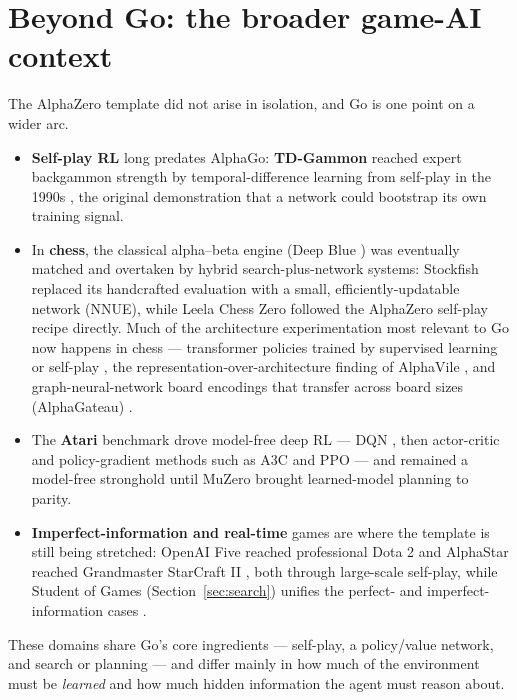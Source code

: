 \documentclass[11pt]{article}
\begin{document}
\section{Beyond Go: the broader game-AI context}
\label{sec:beyond}
The AlphaZero template did not arise in isolation, and Go is one point on a wider arc.
\begin{itemize}[noitemsep]
  \item \textbf{Self-play RL} long predates AlphaGo: \textbf{TD-Gammon} reached expert
        backgammon strength by temporal-difference learning from self-play in the
        1990s \cite{tdgammon1995}, the original demonstration that a network could bootstrap
        its own training signal.
  \item In \textbf{chess}, the classical alpha--beta engine (Deep Blue \cite{deepblue2002})
        was eventually matched and overtaken by hybrid search-plus-network systems: Stockfish
        replaced its handcrafted evaluation with a small, efficiently-updatable network
        (NNUE), while Leela Chess Zero followed the AlphaZero self-play recipe directly. Much
        of the architecture experimentation most relevant to Go now happens in chess ---
        transformer policies trained by supervised learning \cite{chessbench2024} or
        self-play \cite{chessformer2024}, the representation-over-architecture finding of
        AlphaVile \cite{alphavile2024}, and graph-neural-network board encodings that transfer
        across board sizes (AlphaGateau) \cite{alphagateau2024}.
  \item The \textbf{Atari} benchmark drove model-free deep RL --- DQN \cite{dqn2015}, then
        actor-critic and policy-gradient methods such as A3C \cite{a3c2016} and PPO
        \cite{ppo2017} --- and remained a model-free stronghold until MuZero \cite{muzero2020}
        brought learned-model planning to parity.
  \item \textbf{Imperfect-information and real-time} games are where the template is still
        being stretched: OpenAI Five reached professional Dota 2 \cite{openaifive2019} and
        AlphaStar reached Grandmaster StarCraft II \cite{alphastar2019}, both through
        large-scale self-play, while Student of Games (Section~\ref{sec:search}) unifies the
        perfect- and imperfect-information cases \cite{studentofgames2022}.
\end{itemize}
These domains share Go's core ingredients --- self-play, a policy/value network, and search
or planning --- and differ mainly in how much of the environment must be \emph{learned} and
how much hidden information the agent must reason about.
\end{document}
